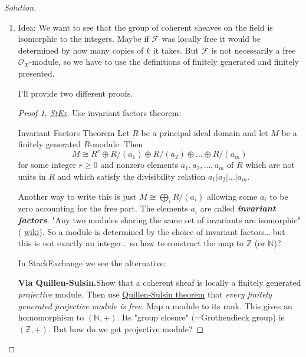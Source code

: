 \begin{proof}[Solution]\leavevmode
	\begin{enumerate}[label=\alph*.]
		\item 	Idea: We want to see that the group of coherent sheaves on the field is isomorphic to the integers. Maybe if $\mathcal{F}$ was locally free it would be determined by how many copies of $k$ it takes. But $\mathcal{F}$ is not necessarily a free $\mathcal{O}_X$-module, so we have to use the definitions of finitely generated and finitely presented.
		
		I'll provide two different proofs.

		\begin{proof}[Proof 1, \href{https://math.stackexchange.com/questions/3358770/proof-check-calculating-the-grothendieck-group-of-kx-where-k-is-a-field}{StEx}]\leavevmode
			Use invariant factors theorem:
				 \begin{thing4}{Invariant Factors Theorem}\leavevmode
		Let $R$ be a principal ideal domain and let $M$ be a finitely generated $R$-module. Then 
		\[M\cong  R^r\oplus R/(a_1)\oplus R/(a_2)\oplus \ldots\oplus R/(a_m)\]
		for some integer $r\geq 0$ and nonzero elements $a_1,a_2,\ldots,a_m$ of $R$ which are not units in $R$ and which satisfy the divisibility relation $a_1|a_2|\ldots|a_m$.
		 \end{thing4}

		 Another way to write this is just $M\cong \bigoplus_{i} R/(a_i)$ allowing some  $a_i$ to be zero accounting for the free part. The elements $a_i$ are called \textit{\textbf{invariant factors}}. "Any two modules sharing the same set of invariants are isomorphic" ( \href{https://en.wikipedia.org/wiki/Structure_theorem_for_finitely_generated_modules_over_a_principal_ideal_domain#Invariant_factor_decomposition}{wiki}).  {\color{2}So a module is determined by the choice of invariant factors… but this is not exactly an integer… so how to construct the map to $\mathbb{Z}$ (or $\mathbb{N}$)?}

			 In StackExchange we see the alternative:

				 {\color{4}\bfseries Via Quillen-Sulsin.}\hspace{.5em}Show that a coherent sheaf is locally a finitely generated \textit{projective} module. Then use \href{https://en.wikipedia.org/wiki/Quillen%E2%80%93Suslin_theorem}{Quillen-Sulsin theorem} that \textit{every finitely generated projective module is free}. Map a module to its rank. This gives an homomorphism to $(\mathbb{N},+)$. Its "group closure" (=Grothendieck group) is $(\mathbb{Z},+)$. {\color{2}But how do we get projective module?}
		\end{proof}


\end{enumerate}
\end{proof}
